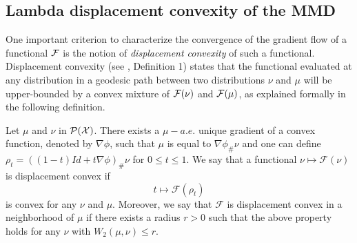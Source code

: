 


\subsection{Lambda displacement convexity of the MMD}

One important criterion to characterize the convergence of the gradient flow of a functional ${{\mathcal F}}$ is the notion of \textit{displacement convexity} of such a functional. Displacement convexity (see \cite{Villani:2004}, Definition 1) states that the functional evaluated at any distribution in a geodesic path between two distributions $\nu$ and $\mu$ will be upper-bounded by a convex mixture of ${{\mathcal F}}(\nu)$ and ${{\mathcal F}}(\mu)$, as explained formally in the following definition.
\begin{definition}\label{def:displacement_convexity}
 Let $\mu$
and $\nu$ in $\mathcal{P}({{\mathcal X}})$. There exists a $\mu-a.e.$
unique gradient of a convex function, denoted by $\nabla\phi$, such that $\mu$
is equal to $\nabla\phi_{\#}\nu$ and one can define  $\rho_{t}=((1-t)Id+t\nabla\phi)_{\#}\nu$
for $0\leq t\leq1$. We say that a functional $\nu\mapsto\mathcal{F}(\nu)$
is displacement convex if 
\begin{equation}
t\mapsto\mathcal{F}(\rho_{t})
\end{equation}
 is convex for any $\nu$ and $\mu$. Moreover, we say that $\mathcal{F}$
is displacement convex in a neighborhood of $\mu$ if there exists a radius $r>0$
such that the above property holds for any $\nu$ with $W_{2}(\mu,\nu)\leq r$.
\end{definition}


